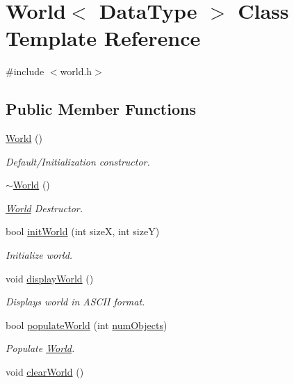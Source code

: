 \hypertarget{class_world}{}\section{World$<$ Data\+Type $>$ Class Template Reference}
\label{class_world}


{\ttfamily \#include $<$world.\+h$>$}

\subsection*{Public Member Functions}
\begin{DoxyCompactItemize}
\item 
\hyperlink{class_world_a7edba001158e18402f6855ac5f40ed65}{World} ()
\begin{DoxyCompactList}\small\item\em Default/\+Initialization constructor. \end{DoxyCompactList}\item 
\hyperlink{class_world_a14051ba115660e37c5eba8c71f02bffd}{$\sim$\+World} ()
\begin{DoxyCompactList}\small\item\em \hyperlink{class_world}{World} Destructor. \end{DoxyCompactList}\item 
bool \hyperlink{class_world_a98a358741fbc2e570426bba0bee7b326}{init\+World} (int sizeX, int sizeY)
\begin{DoxyCompactList}\small\item\em Initialize world. \end{DoxyCompactList}\item 
void \hyperlink{class_world_a5a8087d89f416b83dd42d5bf961fb640}{display\+World} ()
\begin{DoxyCompactList}\small\item\em Displays world in A\+S\+C\+II format. \end{DoxyCompactList}\item 
bool \hyperlink{class_world_adde4546b86afa23ecc7420938376d62c}{populate\+World} (int \hyperlink{class_world_a1fe4efb713f70d780c03481db59e403f}{num\+Objects})
\begin{DoxyCompactList}\small\item\em Populate \hyperlink{class_world}{World}. \end{DoxyCompactList}\item 
void \hyperlink{class_world_af31bc0ee4c2303eabd84765deff08a8a}{clear\+World} ()

\end{DoxyCompactItemize}
